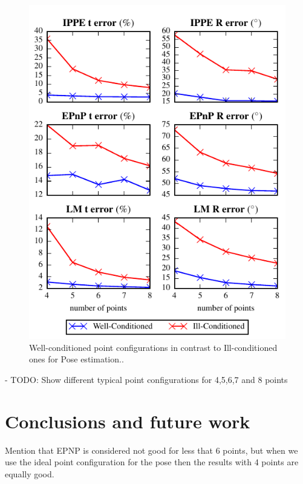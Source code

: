 \documentclass[letterpaper, 10 pt, conference]{ieeeconf}  %
\begin{document}
\begin{figure}[t]
  \begin{center}
    \includegraphics[width=\columnwidth]{img/point_config_comp_pose.pdf}
    \caption{\label{fig:homography_results} Well-conditioned point configurations in contrast to Ill-conditioned ones for Pose estimation..}
  \end{center}
\end{figure}


- TODO: Show different typical point configurations for 4,5,6,7 and 8 points
	

\section{Conclusions and future work}
\label{Conc}
Mention that EPNP is considered not good for less that 6 points, but when we use the ideal point configuration for the pose then the results with 4 points are equally good.

\end{document}
